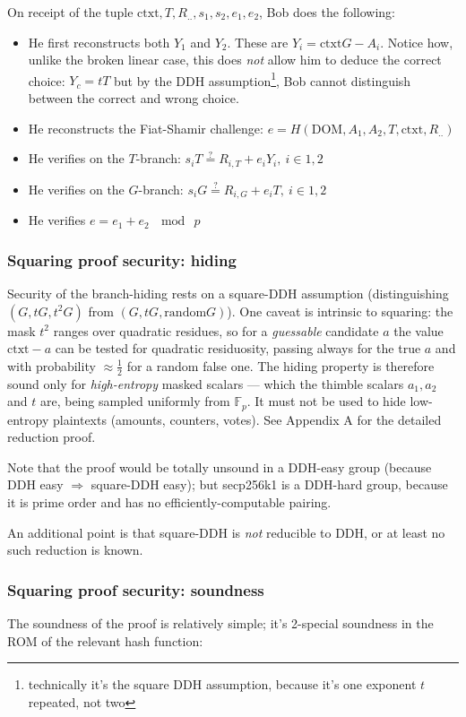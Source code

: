 \documentclass[11pt]{article}
\begin{document}
On receipt of the tuple $\textrm{ctxt}, T, R_{..}, s_1, s_2, e_1, e_2$, Bob does the following:

\begin{itemize}
\item He first reconstructs both $Y_1$ and $Y_2$. These are $Y_i = \textrm{ctxt}G - A_i$. Notice how, unlike the broken linear case, this does \emph{not} allow him to deduce the correct choice: $Y_c = tT$ but by the DDH assumption\footnote{technically it's the square DDH assumption, because it's one exponent $t$ repeated, not two}, Bob cannot distinguish between the correct and wrong choice.
\item He reconstructs the Fiat-Shamir challenge: $e = H(\textrm{DOM}, A_1, A_2, T, \textrm{ctxt}, R_{..})$
\item He verifies on the $T$-branch: $s_i T \stackrel{?}{=} R_{i,T} + e_i Y_i,\ i \in 1,2$
\item He verifies on the $G$-branch: $s_i G \stackrel{?}{=} R_{i,G} + e_i T,\ i \in 1,2$
\item He verifies $e = e_1 + e_2\ \mod\ p$
\end{itemize}

\subsubsection{Squaring proof security: hiding}
Security of the branch-hiding rests on a square-DDH assumption (distinguishing $(G,tG,t^2G)$ from $(G, tG, \textrm{random}G)$). One caveat is intrinsic to squaring: the mask $t^2$ ranges over quadratic residues, so for a \emph{guessable} candidate $a$ the value $\textrm{ctxt}-a$ can be tested for quadratic residuosity, passing always for the true $a$ and with probability $\approx\tfrac12$ for a random false one. The hiding property is therefore sound only for \emph{high-entropy} masked scalars --- which the thimble scalars $a_1,a_2$ and $t$ are, being sampled uniformly from $\mathbb{F}_p$. It must not be used to hide low-entropy plaintexts (amounts, counters, votes). See Appendix A for the detailed reduction proof.

Note that the proof would be totally unsound in a DDH-easy group (because DDH easy $\Rightarrow$ square-DDH easy); but secp256k1 is a DDH-hard group, because it is prime order and has no efficiently-computable pairing.

An additional point is that square-DDH is \emph{not} reducible to DDH, or at least no such reduction is known.

\subsubsection{Squaring proof security: soundness}
The soundness of the proof is relatively simple; it's 2-special soundness in the ROM of the relevant hash function:
\end{document}
